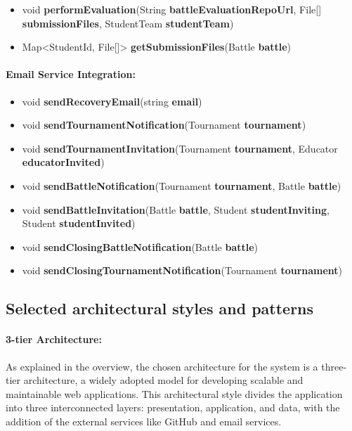 \documentclass{article}
\begin{document}
\begin{itemize}
    \item void \textbf{performEvaluation}(String \textbf{battleEvaluationRepoUrl}, File[] \textbf{submissionFiles}, StudentTeam \textbf{studentTeam})
    \item Map<StudentId, File[]> \textbf{getSubmissionFiles}(Battle \textbf{battle})
\end{itemize}

\paragraph{Email Service Integration:}

\begin{itemize}
    \item void \textbf{sendRecoveryEmail}(string \textbf{email})
    \item void \textbf{sendTournamentNotification}(Tournament \textbf{tournament})
    \item void \textbf{sendTournamentInvitation}(Tournament \textbf{tournament}, Educator \textbf{educatorInvited})
    \item void \textbf{sendBattleNotification}(Tournament \textbf{tournament}, Battle \textbf{battle})
    \item void \textbf{sendBattleInvitation}(Battle \textbf{battle}, Student \textbf{studentInviting}, Student \textbf{studentInvited})
    \item void \textbf{sendClosingBattleNotification}(Battle \textbf{battle})
    \item void \textbf{sendClosingTournamentNotification}(Tournament \textbf{tournament})
\end{itemize}

\subsection{Selected architectural styles and patterns}

\paragraph{3-tier Architecture:}

As explained in the overview, the chosen architecture for the system is a three-tier architecture, a widely adopted
model for developing scalable and maintainable web applications. This architectural 
style divides the application into three interconnected layers: presentation, application,
and data, with the addition of the external services like GitHub and email services.
\end{document}
